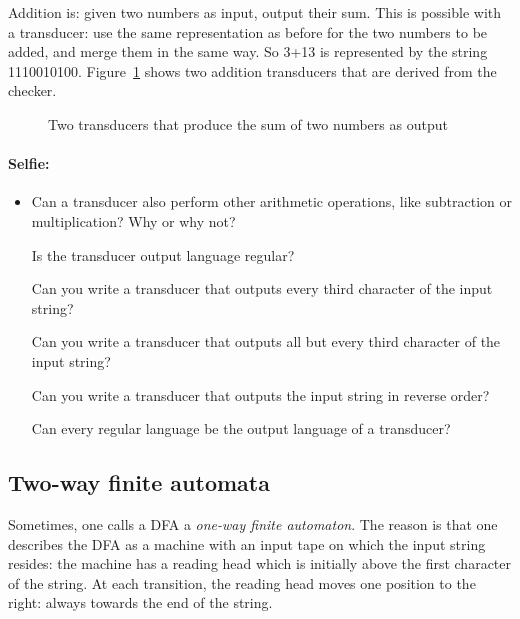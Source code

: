 Addition is: given two numbers as input, output their sum. This is
possible with a transducer: use the same representation as before for
the two numbers to be added, and merge them in the same way. So 3+13
is represented by the string 1110010100. Figure~\ref{telop2} shows two
addition transducers that are derived from the checker.

\begin{figure}[h]
\caption{Two transducers that produce the sum of two numbers as
  output \label{telop2}}
\end{figure}

\newpage
\paragraph{Selfie:}
\begin{itemize}
\item[]
Can a transducer also perform other arithmetic operations, like
subtraction or multiplication? Why or why not?

Is the transducer output language regular?

Can you write a transducer that outputs every third character of the
input string?

Can you write a transducer that outputs all but every third character
of the input string?

Can you write a transducer that outputs the input string in reverse
order?

Can every regular language be the output language of a transducer?
\end{itemize}

\subsection{Two-way finite automata}

Sometimes, one calls a DFA a {\em one-way finite automaton}. The reason
is that one describes the DFA as a machine with an input tape on which
the input string resides: the machine has a reading head which is
initially above the first character of the string. At each transition,
the reading head moves one position to the right: always towards the
end of the string.

